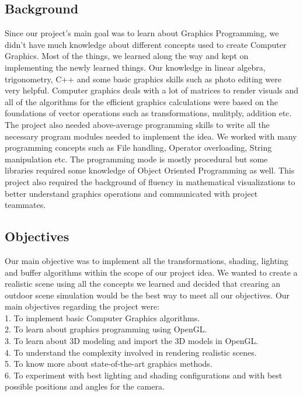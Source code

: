 \documentclass{report}
\begin{document}
\subsection{Background}
    Since our project's main goal was to learn about Graphics Programming, we didn't have much knowledge 
    about different concepts used to create Computer Graphics. Most of the things, we learned along the way 
    and kept on implementing the newly learned things. Our knowledge in linear algebra, trigonometry, C++ 
    and some basic graphics skills such as photo editing were very helpful. Computer graphics deals with 
    a lot of matrices to render visuals and all of the algorithms for the efficient graphics calculations 
    were based on the foundations of vector operations such as transformations, mulitply, addition etc. The 
    project also needed above-average programming skills to write all the necessary program modules needed 
    to implement the idea. We worked with many programming concepts such as File handling, Operator overloading, 
    String manipulation etc. The programming mode is mostly procedural but some libraries required some knowledge 
    of Object Oriented Programming as well. This project also required the background of fluency in mathematical 
    visualizations to better understand graphics operations and communicated with project teammates.
\subsection{Objectives}
    Our main objective was to implement all the transformations, shading, lighting and buffer algorithms within 
    the scope of our project idea. We wanted to create a realistic scene using all the concepts we learned and 
    decided that crearing an outdoor scene simulation would be the best way to meet all our objectives. Our main 
    objectives regarding the project were:
    \medskip
    \\1.  To implement basic Computer Graphics algorithms.
    \\2.  To learn about graphics programming using OpenGL.
    \\3.  To learn about 3D modeling and import the 3D models in OpenGL.
    \\4.  To understand the complexity involved in rendering realistic scenes.
    \\5.  To know more about state-of-the-art graphics methods.
    \\6.  To experiment with best lighting and shading configurations and with best possible positions and 
    angles for the camera. 
\end{document}
